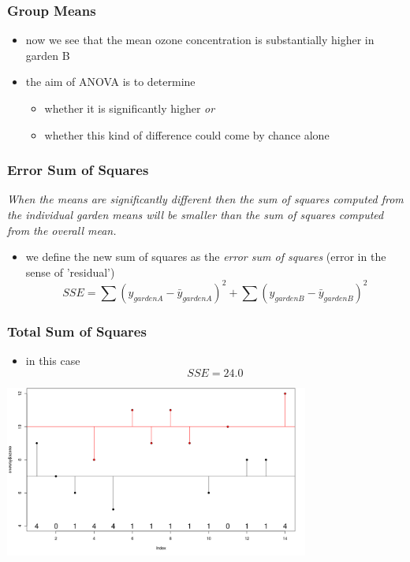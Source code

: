 \begin{frame}\frametitle{Group Means}
  \begin{itemize}
  \item now we see that the mean ozone concentration is substantially higher in garden B
  \item the aim of ANOVA is to determine 
    \begin{itemize}
    \item whether it is significantly higher \emph{or}
    \item whether this kind of difference could come by chance alone
    \end{itemize}
  \end{itemize}
\end{frame}

\begin{frame}\frametitle{Error Sum of Squares}
\emph{ When the means are significantly different then the sum of squares computed from the individual garden means will be smaller than the sum of squares computed from the overall mean. }
  \begin{itemize}
  \item we define the new sum of squares as the \emph{error sum of squares} (error in the sense of 'residual')
$$ SSE = \sum(y_{garden A}-\bar{y}_{garden A})^2+\sum(y_{garden B}-\bar{y}_{garden B})^2$$
  \end{itemize}
\end{frame}

\begin{frame}\frametitle{Total Sum of Squares}
  \begin{itemize}
  \item in this case $$SSE = 24.0$$
  \end{itemize}
\begin{center}
\includegraphics[width=10cm]{img/ESS2.png}
\end{center}
\end{frame}



